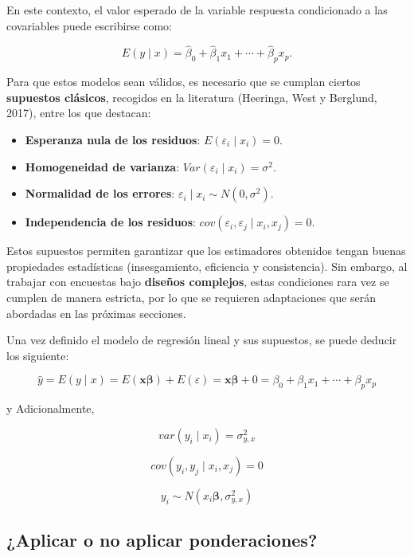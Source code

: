 \documentclass[
  spanish,
  12pt,
]{book}
\providecommand{\tightlist}{%
  \setlength{\itemsep}{0pt}\setlength{\parskip}{0pt}}
\begin{document}
En este contexto, el valor esperado de la variable respuesta condicionado a las covariables puede escribirse como:

\[
E(y \mid x) = \hat{\beta}_{0} + \hat{\beta}_{1}x_{1} + \cdots + \hat{\beta}_{p}x_{p}.
\]

Para que estos modelos sean válidos, es necesario que se cumplan ciertos \textbf{supuestos clásicos}, recogidos en la literatura (Heeringa, West y Berglund, 2017), entre los que destacan:

\begin{itemize}
\tightlist
\item
  \textbf{Esperanza nula de los residuos}: \(E(\varepsilon_{i} \mid x_{i}) = 0\).
\item
  \textbf{Homogeneidad de varianza}: \(Var(\varepsilon_{i} \mid x_{i}) = \sigma^2\).
\item
  \textbf{Normalidad de los errores}: \(\varepsilon_{i} \mid x_{i} \sim N(0,\sigma^2)\).
\item
  \textbf{Independencia de los residuos}: \(cov(\varepsilon_{i},\varepsilon_{j}\mid x_{i},x_{j})=0\).
\end{itemize}

Estos supuestos permiten garantizar que los estimadores obtenidos tengan buenas propiedades estadísticas (insesgamiento, eficiencia y consistencia). Sin embargo, al trabajar con encuestas bajo \textbf{diseños complejos}, estas condiciones rara vez se cumplen de manera estricta, por lo que se requieren adaptaciones que serán abordadas en las próximas secciones.

Una vez definido el modelo de regresión lineal y sus supuestos, se puede deducir los siguiente:

\[
\hat{y}  =  E\left(y\mid x\right)
 =  E\left(\boldsymbol{x}\boldsymbol{\beta}\right)+E\left(\varepsilon\right)
=  \boldsymbol{x}\boldsymbol{\beta}+0
  =  \beta_{0}+\beta_{1}x_{1}+\cdots+\beta_{p}x_{p}
\]

y Adicionalmente,

\[
var\left(y_{i}\mid x_{i}\right)  =  \sigma_{y,x}^{2}
\]

\[
cov\left(y_{i},y_{j}\mid x_{i},x_{j}\right)  = 0
\]

\[
y_{i}  \sim  N\left(x_{i}\boldsymbol{\beta},\sigma_{y,x}^{2}\right)
\]

\subsection{¿Aplicar o no aplicar ponderaciones?}\label{aplicar-o-no-aplicar-ponderaciones}
\end{document}
